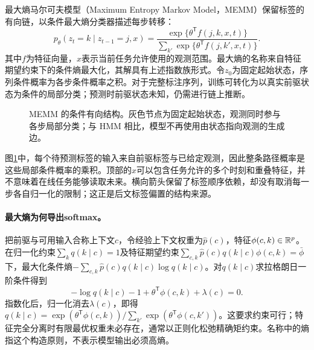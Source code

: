 最大熵马尔可夫模型（Maximum Entropy Markov Model，MEMM）保留标签的有向链，以条件最大熵分类器描述每步转移\cite{mccallum2000memm}：
\begin{equation}
 p_\theta(z_t=k\mid z_{t-1}=j,x)=
 \frac{\exp\{\theta^{\mathsf T}f(j,k,x,t)\}}
 {\sum_{k'}\exp\{\theta^{\mathsf T}f(j,k',x,t)\}}.
\end{equation}
其中$f$为特征向量，$x$表示当前任务允许使用的观测范围。最大熵的名称来自特征期望约束下的条件熵最大化，其解具有上述指数族形式。令$z_0$为固定起始状态，序列条件概率为各步条件概率之积。对于完整标注序列，训练可转化为以真实前驱状态为条件的局部分类；预测时前驱状态未知，仍需进行链上推断。

\begin{figure}[htbp]
\centering
{}
\caption{MEMM 的条件有向结构。灰色节点为固定起始状态，观测同时参与各步局部分类；与 HMM 相比，模型不再使用由状态指向观测的生成边。}
\label{fig:bayes-memm-structure}
\end{figure}
图\ref{fig:bayes-memm-structure}中，每个待预测标签的输入来自前驱标签与已给定观测，因此整条路径概率是这些局部条件概率的乘积。顶部的$x$可以包含任务允许的多个时刻和重叠特征，并不意味着在线任务能够读取未来。横向箭头保留了标签顺序依赖，却没有取消每一步各自归一化的限制；这正是后文标签偏置的结构来源。

\paragraph{最大熵为何导出softmax。}
把前驱与可用输入合称上下文$c$，令经验上下文权重为$\hat p(c)$，特征$\phi(c,k)\in\mathbb{R}^p$。在归一化约束$\sum_kq(k\mid c)=1$及特征期望约束$\sum_{c,k}\hat p(c)q(k\mid c)\phi(c,k)=\bar\phi$下，最大化条件熵$-\sum_{c,k}\hat p(c)q(k\mid c)\log q(k\mid c)$。对$q(k\mid c)$求拉格朗日一阶条件得到
\begin{equation}
 -\log q(k\mid c)-1+\theta^{\mathsf T}\phi(c,k)+\lambda(c)=0.
\end{equation}
指数化后，归一化消去$\lambda(c)$，即得$q(k\mid c)=\exp(\theta^{\mathsf T}\phi(c,k))/\sum_{k'}\exp(\theta^{\mathsf T}\phi(c,k'))$。这要求约束可行；特征完全分离时有限最优权重未必存在，通常以正则化松弛精确矩约束。名称中的熵指这个构造原则，不表示模型输出必须高熵。

